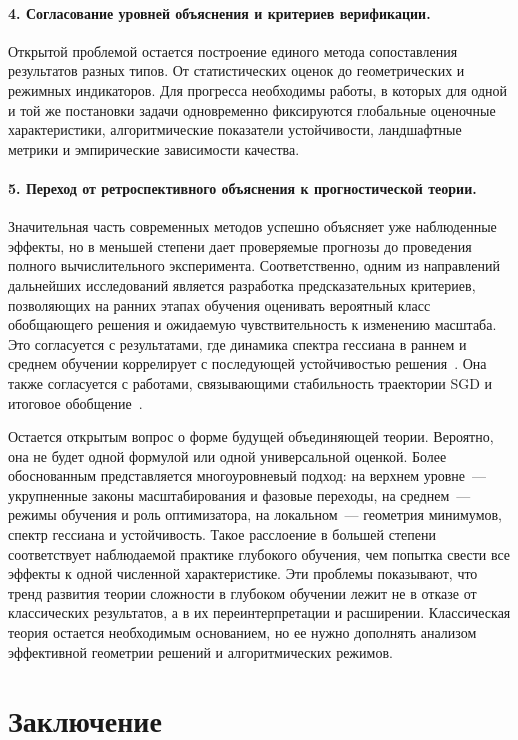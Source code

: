 \documentclass[russian]{intsys}
\begin{document}
\paragraph{4. Согласование уровней объяснения и критериев верификации.}
Открытой проблемой остается построение единого метода сопоставления результатов разных типов.
От статистических оценок до геометрических и режимных индикаторов.
Для прогресса необходимы работы, в которых для одной и той же постановки задачи одновременно фиксируются глобальные оценочные характеристики, алгоритмические показатели устойчивости, ландшафтные метрики и эмпирические зависимости качества.

\paragraph{5. Переход от ретроспективного объяснения к прогностической теории.}
Значительная часть современных методов успешно объясняет уже наблюденные эффекты, но в меньшей степени дает проверяемые прогнозы до проведения полного вычислительного эксперимента.
Соответственно, одним из направлений дальнейших исследований является разработка предсказательных критериев, позволяющих на ранних этапах обучения оценивать вероятный класс обобщающего решения и ожидаемую чувствительность к изменению масштаба.
Это согласуется с результатами, где динамика спектра гессиана в раннем и среднем обучении коррелирует с последующей устойчивостью решения~\cite{hessian2019sgd,hessianpowerlaw2022}.
Она также согласуется с работами, связывающими стабильность траектории SGD и итоговое обобщение~\cite{sgdstability2023,sgd2020stability}.

Остается открытым вопрос о форме будущей объединяющей теории.
Вероятно, она не будет одной формулой или одной универсальной оценкой.
Более обоснованным представляется многоуровневый подход: на верхнем уровне~--- укрупненные законы масштабирования и фазовые переходы, на среднем~--- режимы обучения и роль оптимизатора, на локальном~--- геометрия минимумов, спектр гессиана и устойчивость.
Такое расслоение в большей степени соответствует наблюдаемой практике глубокого обучения, чем попытка свести все эффекты к одной численной характеристике.
Эти проблемы показывают, что тренд развития теории сложности в глубоком обучении лежит не в отказе от классических результатов, а в их переинтерпретации и расширении.
Классическая теория остается необходимым основанием, но ее нужно дополнять анализом эффективной геометрии решений и алгоритмических режимов.

\section{Заключение}
\end{document}
